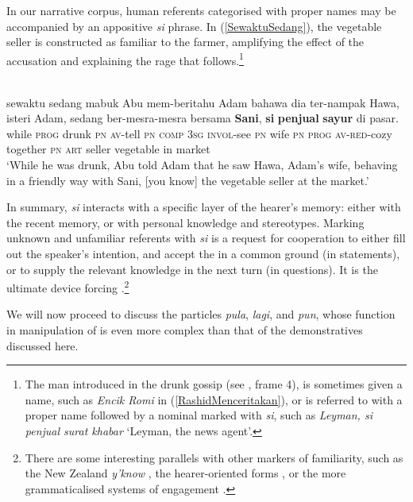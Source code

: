 \documentclass[output=paper
,modfonts
,nonflat]{langsci/langscibook}
\begin{document}
\noindent
In our narrative corpus, human referents categorised with proper names may be accompanied by an appositive \emph{si} phrase. In (\ref{SewaktuSedang}), the vegetable seller is constructed as familiar to the farmer, amplifying the effect of the accusation and explaining the rage that follows.\footnote{The man introduced in the drunk gossip (see , frame 4), is sometimes given a name, such as \emph{Encik Romi} in (\ref{RashidMenceritakan}), or is referred to with a proper name followed by a nominal marked with \emph{si}, such as \emph{Leyman, si penjual surat khabar} `Leyman, the news agent'.} 

\ea\label{SewaktuSedang}  
\\
	\gll sewaktu     sedang mabuk Abu         mem-beritahu Adam bahawa dia ter-nampak Hawa, isteri Adam, sedang ber-mesra-mesra      bersama   {\ob}\textbf{Sani},       \textbf{si}  \textbf{penjual} \textbf{sayur}{\cb}     di pasar.\\
while  \textsc{prog}   drunk \textsc{pn} \textsc{av-}tell        \textsc{pn} \textsc{comp}   \textsc{3sg} \textsc{invol-}see       \textsc{pn}  wife   \textsc{pn} \textsc{prog}   \textsc{av-}\textsc{red}-cozy  together \textsc{pn} \textsc{art} seller  vegetable in market\\
\glt `While he was drunk, Abu told Adam that he saw Hawa, Adam's wife, behaving  in a friendly way with Sani, [you know] the vegetable seller at the market.'
\z

\noindent
In summary,  \emph{si} interacts with a specific layer of the hearer's memory: either with the recent memory, or with personal knowledge and stereotypes. Marking unknown and unfamiliar referents with \emph{si} is a request for cooperation to either fill out the speaker's intention, and accept the  in a common ground (in statements), or to supply the relevant knowledge in the next turn (in questions). It is the ultimate device forcing .\footnote{There are some interesting parallels with other markers of familiarity, such as the New Zealand \emph{y'know} \citep[69]{Stubbe1995}, the  hearer-oriented forms \citep{KraDel2015Definiteness}, or the more grammaticalised systems of engagement \citep{Evans2017a, Evans2017b}.}

We will now proceed to discuss the  particles \emph{pula}, \emph{lagi}, and \emph{pun}, whose function in manipulation of  is even more complex than that of the demonstratives discussed here.
\end{document}
